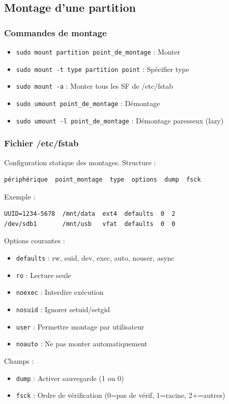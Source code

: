 \documentclass[12pt,a4paper]{article}
\begin{document}
\subsection{Montage d'une partition}

\subsubsection{Commandes de montage}
\begin{itemize}
    \item \texttt{sudo mount partition point\_de\_montage} : Monter
    \item \texttt{sudo mount -t type partition point} : Spécifier type
    \item \texttt{sudo mount -a} : Monter tous les SF de /etc/fstab
    \item \texttt{sudo umount point\_de\_montage} : Démontage
    \item \texttt{sudo umount -l point\_de\_montage} : Démontage paresseux (lazy)
\end{itemize}

\subsubsection{Fichier /etc/fstab}
Configuration statique des montages. Structure :
\begin{verbatim}
périphérique  point_montage  type  options  dump  fsck
\end{verbatim}

Exemple :
\begin{verbatim}
UUID=1234-5678  /mnt/data  ext4  defaults  0  2
/dev/sdb1       /mnt/usb   vfat  defaults  0  0
\end{verbatim}

Options courantes :
\begin{itemize}
    \item \texttt{defaults} : rw, suid, dev, exec, auto, nouser, async
    \item \texttt{ro} : Lecture seule
    \item \texttt{noexec} : Interdire exécution
    \item \texttt{nosuid} : Ignorer setuid/setgid
    \item \texttt{user} : Permettre montage par utilisateur
    \item \texttt{noauto} : Ne pas monter automatiquement
\end{itemize}

Champs :
\begin{itemize}
    \item \texttt{dump} : Activer sauvegarde (1 ou 0)
    \item \texttt{fsck} : Ordre de vérification (0=pas de vérif, 1=racine, 2+=autres)
\end{itemize}
\end{document}
